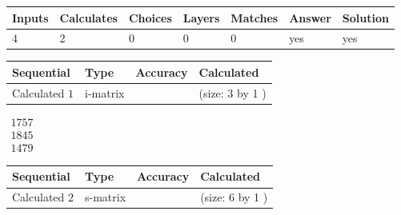 \documentclass[12pt]{article}
\begin{document}
 
 
\noindent{}
 
 

 
 
 
\noindent{}
 
 

 
 
\noindent{}
 
 

 
\vspace{0.3in}
   
   
   
   
\noindent\begin{tabular}{|l|l|l|l|l|l|l|}
 \hline
Inputs & Calculates & Choices & Layers & Matches & Answer & Solution \\ \hline
 4  & 
 2  & 
 0
  & 
 0  & 
 0  & 
  yes & 
  yes 
  \\ \hline
 \end{tabular}
   
   
   
   
\noindent{}
   
   
  
  
\noindent\begin{tabular}{|l|l|l|l|}
\hline
 Sequential & Type & Accuracy & Calculated \\ 
\hline
 
 
  Calculated $  1 $ & i-matrix &  & 
 (size:  3  by  1 )
 \\  \hline  
 \end{tabular}
   
   
$\begin{array}{
 c
 }
 1757  \\ 
 1845  \\ 
 1479
 \end{array}  $ 
  
  
\noindent\begin{tabular}{|l|l|l|l|}
\hline
 Sequential & Type & Accuracy & Calculated \\ 
\hline
 
 
  Calculated $  2 $ & s-matrix & & 
 (size:  6  by  1 )
 \\  \hline  
 \end{tabular}
   
\end{document}
